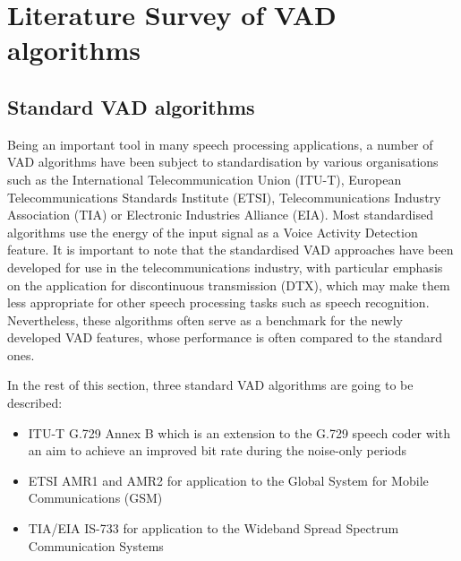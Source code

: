 
\chapter{Literature Survey of VAD algorithms} %

\label{Chapter2} %



\section{Standard VAD algorithms}
\label{sec:StandardVADs}

Being an important tool in many speech processing applications, a number of VAD algorithms have been subject to standardisation by various organisations such as the International Telecommunication Union (ITU-T), European Telecommunications Standards Institute (ETSI), Telecommunications Industry Association (TIA) or Electronic Industries Alliance (EIA). Most standardised algorithms use the energy of the input signal as a Voice Activity Detection feature. It is important to note that the standardised VAD approaches have been developed for use in the telecommunications industry, with particular emphasis on the application for discontinuous transmission (DTX), which may make them less appropriate for other speech processing tasks such as speech recognition. Nevertheless, these algorithms often serve as a benchmark for the newly developed VAD features, whose performance is often compared to the standard ones.

In the rest of this section, three standard VAD algorithms are going to be described:
\begin{itemize}
\item ITU-T G.729 Annex B \citep{G729} which is an extension to the G.729 speech coder with an aim to achieve an improved bit rate during the noise-only periods
\item ETSI AMR1 and AMR2 \cite{AMR} for application to the Global System for Mobile Communications (GSM)
\item TIA/EIA IS-733 \cite{IS733} for application to the Wideband Spread Spectrum Communication Systems
\end{itemize}

